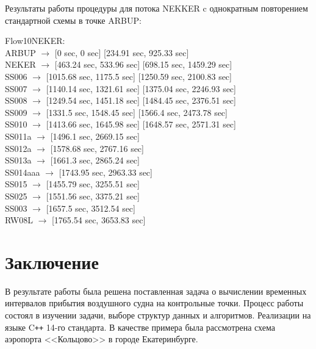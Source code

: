 \documentclass[12pt, a4 paper]{article}
\theoremstyle{plain}
\begin{document}
Результаты работы процедуры для потока NEKKER c однократным повторением стандартной схемы в точке ARBUP:

\noindent Flow10NEKER:\\
ARBUP $\rightarrow$ [0 sec, 0 sec] [234.91 sec, 925.33 sec]\\
NEKER $\rightarrow$ [463.24 sec, 533.96 sec] [698.15 sec, 1459.29 sec]\\
SS006 $\rightarrow$ [1015.68 sec, 1175.5 sec] [1250.59 sec, 2100.83 sec]\\
SS007 $\rightarrow$ [1140.14 sec, 1321.61 sec] [1375.04 sec, 2246.93 sec]\\
SS008 $\rightarrow$ [1249.54 sec, 1451.18 sec] [1484.45 sec, 2376.51 sec]\\
SS009 $\rightarrow$ [1331.5 sec, 1548.45 sec] [1566.4 sec, 2473.78 sec]\\
SS010 $\rightarrow$ [1413.66 sec, 1645.98 sec] [1648.57 sec, 2571.31 sec]\\
SS011a $\rightarrow$ [1496.1 sec, 2669.15 sec]\\
SS012a $\rightarrow$ [1578.68 sec, 2767.16 sec]\\
SS013a $\rightarrow$ [1661.3 sec, 2865.24 sec]\\
SS014aaa $\rightarrow$ [1743.95 sec, 2963.33 sec]\\
SS015 $\rightarrow$ [1455.79 sec, 3255.51 sec]\\
SS025 $\rightarrow$ [1551.56 sec, 3375.21 sec]\\
SS003 $\rightarrow$ [1657.5 sec, 3512.54 sec]\\
RW08L $\rightarrow$ [1765.54 sec, 3653.83 sec]\\

\newpage

\section*{Заключение}

В результате работы была решена поставленная задача о вычислении временных интервалов прибытия воздушного судна на контрольные точки. Процесс работы состоял в изучении задачи, выборе структур данных и алгоритмов. Реализации на языке C{}\verb!++! 14-го стандарта. В качестве примера была рассмотрена схема аэропорта <<Кольцово>> в городе Екатеринбурге.

\newpage
\end{document}
